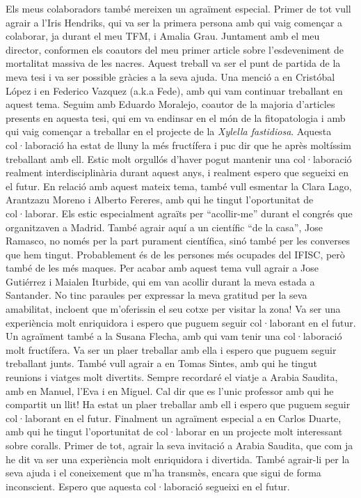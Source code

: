 {%
Els meus colaboradors també mereixen un agraïment especial. Primer de tot vull
agrair a l'Iris Hendriks, qui va ser la primera persona amb qui vaig començar a
colaborar, ja durant el meu TFM, i Amalia Grau. Juntament amb el meu director,
conformen els coautors del meu primer article sobre l'esdeveniment de
mortalitat massiva de les nacres. Aquest treball va ser el punt de partida de
la meva tesi i va ser possible gràcies a la seva ajuda. Una menció a en
Cristóbal López i en Federico Vazquez (a.k.a Fede), amb qui vam continuar
treballant en aquest tema. Seguim amb Eduardo Moralejo, coautor de la majoria
d'articles presents en aquesta tesi, qui em va endinsar en el món de la
fitopatologia i amb qui vaig començar a treballar en el projecte de la
\textit{Xylella fastidiosa}. Aquesta col·laboració ha estat de lluny la més
fructífera i puc dir que he après moltíssim treballant amb ell. Estic molt
orgullós d'haver pogut mantenir una col·laboració realment interdisciplinària
durant aquest anys, i realment espero que segueixi en el futur. En relació amb
aquest mateix tema, també vull esmentar la Clara Lago, Arantzazu Moreno i
Alberto Fereres, amb qui he tingut l'oportunitat de col·laborar. Els estic
especialment agraïts per ``acollir-me'' durant el congrés que organitzaven a
Madrid. També agrair aquí a un científic ``de la casa'', Jose Ramasco, no només
per la part purament científica, sinó també per les converses que hem tingut.
Probablement és de les persones més ocupades del IFISC, però també de les més
maques. Per acabar amb aquest tema vull agrair a Jose Gutiérrez i Maialen
Iturbide, qui em van acollir durant la meva estada a Santander. No tinc
paraules per expressar la meva gratitud per la seva amabilitat, incloent que
m'oferissin el seu cotxe per visitar la zona! Va ser una experiència molt
enriquidora i espero que puguem seguir col·laborant en el futur. Un agraïment
també a la Susana Flecha, amb qui vam tenir una col·laboració molt fructífera.
Va ser un plaer treballar amb ella i espero que puguem seguir treballant junts.
També vull agrair a en Tomas Sintes, amb qui he tingut reunions i viatges molt
divertits. Sempre recordaré el viatje a Arabia Saudita, amb en Manuel, l'Eva i
en Miguel. Cal dir que es l'unic professor amb qui he compartit un llit! Ha
estat un plaer treballar amb ell i espero que puguem seguir col·laborant en el
futur. Finalment un agraïment especial a en Carlos Duarte, amb qui he tingut
l'oportunitat de col·laborar en un projecte molt interessant sobre coralls.
Primer de tot, agrair la seva invitació a Arabia Saudita, que com ja he dit va
ser una experiència molt enriquidora i divertida. També agrair-li per la seva
ajuda i el coneixement que m'ha transmès, encara que sigui de forma
inconscient. Espero que aquesta col·laboració segueixi en el futur. \\

}
